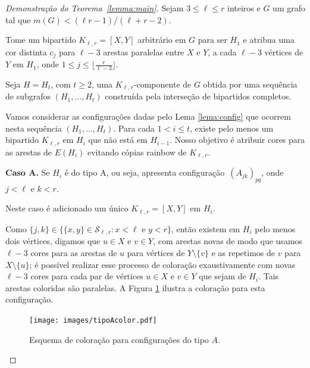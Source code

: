 \documentclass[12pt,a4paper]{book}
\newcommand{\K}{K_{\ell,r}} %
\newcommand{\Slr}{\mathcal{S}_{\ell,r}} %
\begin{document}
    \begin{proof}[Demonstração do Teorema~\ref{lemma:main}]
      Sejam $3 \leq \ell \leq r$ inteiros e $G$ um grafo tal que $m(G) < (\ell r - 1)/(\ell+r-2)$.
    
        Tome um bipartido $\K = [X,Y]$ arbitrário em $G$ para ser $H_1$ e atribua uma cor distinta $c_j$ para $\ell-3$ arestas paralelas entre $X$ e $Y$, a cada $\ell-3$ vértices de $Y$ em $H_1$, onde
        $1 \leq j \leq \lfloor \frac{r}{\ell-3}\rfloor$.

        Seja $H = H_t$, com $t \geq 2$, uma $\K$-componente de $G$ obtida por uma sequência de subgrafos $(H_1, \ldots, H_t)$ construída pela interseção de bipartidos completos.

         Vamos considerar as configurações dadas pelo Lema \ref{lema:config} que ocorrem nesta sequência $(H_1, \ldots, H_t)$.
         Para cada $1 < i \leq t$, existe pelo menos um bipartido $\K$ em $H_{i}$ que não está em $H_{i-1}$.
         Nosso objetivo é atribuir cores para as arestas de $E(H_{i})$ evitando cópias rainbow de $\K$.

         \medskip \textbf{Caso A.} Se $H_i$ é do tipo A, ou seja, apresenta configuração~\hyperref[configA]{$(A_{jk})_{pq}$}, onde $j < \ell$ e $k < r$.
         
        Neste caso é adicionado um único $\K = [X,Y]$ em $H_i$.      

        Como $\{j,k\} \in \{\{x,y\} \in \Slr: x < \ell \text{ e } y < r\}$, então existem em $H_i$ pelo menos dois vértices, digamos que $u\in X$ e $v\in Y$, com arestas novas de modo que 
        usamos $\ell-3$ cores para as arestas de $u$ para vértices de $Y\setminus\{v\}$ e as repetimos de $v$ para $X\setminus\{u\}$; é possível realizar esse processo de coloração exaustivamente com novas $\ell-3$ cores para cada par de vértices $u\in X$ e $v\in Y$ que sejam de $H_i$.
        Tais arestas coloridas são paralelas.
        A Figura \ref{fig:configAcor} ilustra a coloração para esta configuração.

 \begin{figure}[htb] \centering \texttt{[image: images/tipoAcolor.pdf]}
   \caption{Esquema de coloração para configurações do tipo $A$.}
   \label{fig:configAcor}
 \end{figure}


\end{proof}
\end{document}
